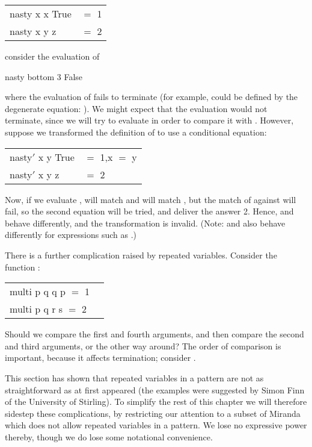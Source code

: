\begin{mlcoded}
\begin{tabular}{ll}
    nasty x x True &$=$ 1\\
    nasty x y z &$=$ 2
\end{tabular}
\end{mlcoded}
consider the evaluation of
\begin{mlcoded}
    nasty bottom 3 False
\end{mlcoded}
where the evaluation of  fails to terminate (for example,  could be defined by the degenerate equation: ). We might expect that the evaluation  would not terminate, since we will try to evaluate  in order to compare it with . However, suppose we transformed the definition of  to use a conditional equation:
\begin{mlcoded}
\begin{tabular}{ll}
    nasty$'$ x y True &$=$ 1,\qquad x $=$ y\\
    nasty$'$ x y z &$=$ 2
\end{tabular}
\end{mlcoded}
Now, if we evaluate ,  will match  and  will match , but the match of  against  will fail, so the second equation will be tried, and deliver the answer 2. Hence,  and  behave differently, and the transformation is invalid. (Note:  and  also behave differently for expressions such as .)

There is a further complication raised by repeated variables. Consider the function :
\begin{mlcoded}
\begin{tabular}{ll}
        multi p q q p $=$ 1\\
    multi p q r s $=$ 2
\end{tabular}
\end{mlcoded}

Should we compare the first and fourth arguments, and then compare the second and third arguments, or the other way around? The order of comparison is important, because it affects termination; consider .

This section has shown that repeated variables in a pattern are not as straightforward as at first appeared (the examples were suggested by Simon Finn of the University of Stirling). To simplify the rest of this chapter we will therefore sidestep these complications, by restricting our attention to a subset of Miranda which does not allow repeated variables in a pattern. We lose no expressive power thereby, though we do lose some notational convenience.

